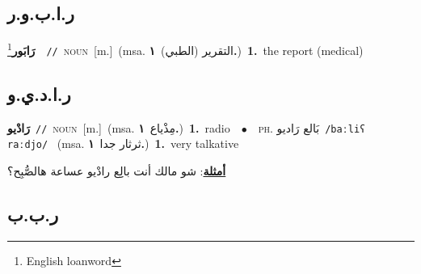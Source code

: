 \documentclass[10pt,a4paper,twoside]{article} %
\begin{document}
\begin{multicols}{2}
{{{{\vspace{-3mm}
\subsection*{\color{blue}\foreignlanguage{arabic}{ر.ا.ب.و.ر}\color{blue}{ (ntws)}} 

{\setlength\topsep{0pt}\textbf{\foreignlanguage{arabic}{رَابَور}}\footnote{English loanword}\ \ {\color{gray}\texttt{//}\color{black}}\ \textsc{noun}\ [m.]\ \color{gray}(msa. \foreignlanguage{arabic}{التقرير (الطبي)}~\foreignlanguage{arabic}{\textbf{١.}})\color{black}\ \textbf{1.}~the report (medical)\ 

\vspace{-3mm}
\subsection*{\color{blue}\foreignlanguage{arabic}{ر.ا.د.ي.و}\color{blue}{ (ntws)}} 

{\setlength\topsep{0pt}\textbf{\foreignlanguage{arabic}{رَادْيو}}\ {\color{gray}\texttt{//}\color{black}}\ \textsc{noun}\ [m.]\ \color{gray}(msa. \foreignlanguage{arabic}{مِذْياع}~\foreignlanguage{arabic}{\textbf{١.}})\color{black}\ \textbf{1.}~radio\ \ $\bullet$\ \ \textsc{ph.} \color{gray} \foreignlanguage{arabic}{بَالع رَاديو}\color{black}\ {\color{gray}\texttt{/{\sffamily baːliʕ raːdjo}/}\color{black}}\ \color{gray} (msa. \foreignlanguage{arabic}{ثرثار جدا}~\foreignlanguage{arabic}{\textbf{١.}})\color{black}\ \textbf{1.}~very talkative\  \begin{flushright}\color{gray}\foreignlanguage{arabic}{\textbf{\underline{\foreignlanguage{arabic}{أمثلة}}}: شو مالك أنت بالِِع رادْيو عساعة هالصُّبِح؟}\end{flushright}\color{black}} \vspace{2mm}

\vspace{-3mm}
\subsection*{\color{blue}\foreignlanguage{arabic}{ر.ب.ب}\color{blue}{}} 

}}}}}
\end{multicols}
\end{document}
